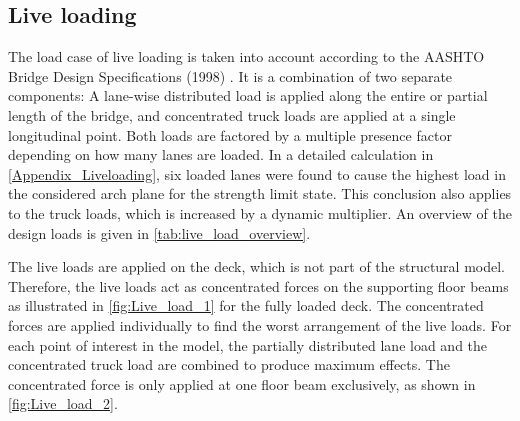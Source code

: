 \subsection{Live loading} \label{sec:met_loads_live}
The load case of live loading is taken into account according to the AASHTO Bridge Design Specifications (1998) \cite{AASHTO}. It is a combination of two separate components: A lane-wise distributed load is applied along the entire or partial length of the bridge, and concentrated truck loads are applied at a single longitudinal point. Both loads are factored by a multiple presence factor depending on how many lanes are loaded. In a detailed calculation in \cref{Appendix_Liveloading}, six loaded lanes were found to cause the highest load in the considered arch plane for the strength limit state. This conclusion also applies to the truck loads, which is increased by a dynamic multiplier. An overview of the design loads is given in \cref{tab:live_load_overview}. 



The live loads are applied on the deck, which is not part of the structural model. Therefore, the live loads act as concentrated forces on the supporting floor beams as illustrated in \cref{fig:Live_load_1} for the fully loaded deck. The concentrated forces are applied individually to find the worst arrangement of the live loads. For each point of interest in the model, the partially distributed lane load and the concentrated truck load are combined to produce maximum effects. The concentrated force is only applied at one floor beam exclusively, as shown in \cref{fig:Live_load_2}. 


